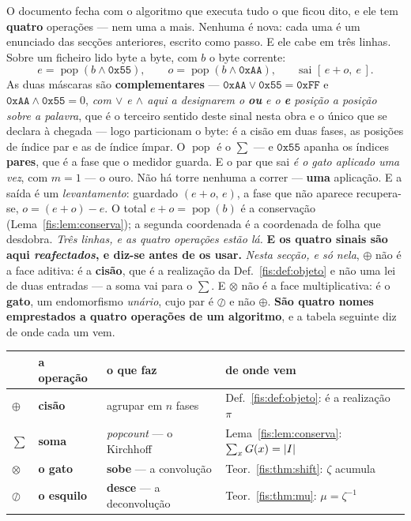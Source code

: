 \documentclass[livro.tex]{subfiles}
\begin{document}
\noindent O documento fecha com o algoritmo que executa tudo o que ficou dito, e
ele tem \textbf{quatro} operações --- nem uma a mais. Nenhuma é nova: cada uma é
um enunciado das secções anteriores, escrito como passo. E ele cabe em três
linhas. Sobre um ficheiro lido byte a byte, com $b$ o byte corrente:
\[
\boxed{\;
e=\operatorname{pop}(b\wedge \mathtt{0x55}),\qquad
o=\operatorname{pop}(b\wedge \mathtt{0xAA}),\qquad
\text{sai } [\,e+o,\ e\,].
\;}
\]
As duas máscaras são \textbf{complementares} --- $\mathtt{0xAA}\vee\mathtt{0x55}
=\mathtt{0xFF}$ e $\mathtt{0xAA}\wedge\mathtt{0x55}=0$, \emph{com $\vee$ e $\wedge$
aqui a designarem o \textbf{ou} e o \textbf{e} posição a posição sobre a palavra},
que é o terceiro sentido deste sinal nesta obra e o único que se declara à
chegada --- logo particionam o
byte: é a cisão em duas fases, as posições de índice par e as de índice ímpar. O
$\operatorname{pop}$ é o $\sum$ --- e $\mathtt{0x55}$ apanha os índices
\textbf{pares}, que é a fase que o medidor guarda. E o par que sai \emph{é o gato
aplicado uma vez}, com $m=1$ --- o ouro. Não há torre nenhuma a correr ---
\textbf{uma} aplicação. E a saída é um
\emph{levantamento}: guardado $(e+o,\,e)$, a fase que não aparece recupera-se,
$o=(e+o)-e$. O total $e+o=\operatorname{pop}(b)$ é a conservação
(Lema~\ref{fis:lem:conserva}); a segunda coordenada é a coordenada de folha que
desdobra. \emph{Três linhas, e as quatro operações estão lá.}
\medskip\noindent\textbf{E os quatro sinais são aqui \emph{reafectados}, e diz-se
antes de os usar.} \emph{Nesta secção, e só nela}, $\oplus$ não é a face aditiva:
é a \textbf{cisão}, que é a realização da Def.~\ref{fis:def:objeto} e não uma lei
de duas entradas --- a soma vai para o $\sum$. E $\otimes$ não é a face
multiplicativa: é o \textbf{gato}, um endomorfismo \emph{unário}, cujo par é
$\oslash$ e não $\oplus$. \textbf{São quatro nomes emprestados a quatro operações
de um algoritmo}, e a tabela seguinte diz de onde cada um vem.

\begin{center}\small
\begin{tabular}{@{}llll@{}}
\toprule
 & a operação & o que faz & de onde vem \\
\midrule
$\oplus$ & \textbf{cisão} & agrupar em $n$ fases & Def.~\ref{fis:def:objeto}: é a realização $\pi$ \\
$\sum$ & \textbf{soma} & \emph{popcount} --- o Kirchhoff & Lema~\ref{fis:lem:conserva}: $\sum_x G(x)=\lvert I\rvert$ \\
$\otimes$ & \textbf{o gato} & \textbf{sobe} --- a convolução & Teor.~\ref{fis:thm:shift}: $\zeta$ acumula \\
$\oslash$ & \textbf{o esquilo} & \textbf{desce} --- a deconvolução & Teor.~\ref{fis:thm:mu}: $\mu=\zeta^{-1}$ \\
\bottomrule
\end{tabular}
\end{center}
\end{document}
